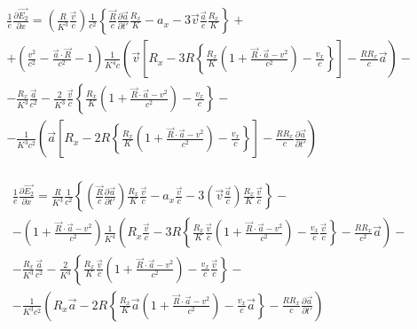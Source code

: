\documentclass[11pt]{article}
\begin{document}
\[\begin{align}
  & \frac{1}{e}\frac{\partial \overrightarrow{{{E}_{2}}}}{\partial x}=\left( \frac{R}{{{K}^{3}}}\frac{\overrightarrow{v}}{c} \right)\frac{1}{{{c}^{2}}}\left\{ \frac{\overrightarrow{R}}{c}\frac{\partial \overrightarrow{a}}{\partial t'}\frac{{{R}_{x}}}{K}-{{a}_{x}}-3\overrightarrow{v}\frac{\overrightarrow{a}}{c}\frac{{{R}_{x}}}{K} \right\}+ \\
 & +\left( \frac{{{v}^{2}}}{{{c}^{2}}}-\frac{\overrightarrow{a}\cdot \overrightarrow{R}}{{{c}^{2}}}-1 \right)\frac{1}{{{K}^{4}}c}\left( \overrightarrow{v}\left[ {{R}_{x}}-3R\left\{ \frac{{{R}_{x}}}{K}\left( 1+\frac{\overrightarrow{R}\cdot \overrightarrow{a}-{{v}^{2}}}{{{c}^{2}}} \right)-\frac{{{v}_{x}}}{c} \right\} \right]-\frac{R{{R}_{x}}}{c}\overrightarrow{a} \right)- \\
 & -\frac{{{R}_{x}}}{{{K}^{3}}}\frac{\overrightarrow{a}}{{{c}^{2}}}-\frac{2}{{{K}^{3}}}\frac{\overrightarrow{v}}{c}\left\{ \frac{{{R}_{x}}}{K}\left( 1+\frac{\overrightarrow{R}\cdot \overrightarrow{a}-{{v}^{2}}}{{{c}^{2}}} \right)-\frac{{{v}_{x}}}{c} \right\}- \\
 & -\frac{1}{{{K}^{3}}{{c}^{2}}}\left( \overrightarrow{a}\left[ {{R}_{x}}-2R\left\{ \frac{{{R}_{x}}}{K}\left( 1+\frac{\overrightarrow{R}\cdot \overrightarrow{a}-{{v}^{2}}}{{{c}^{2}}} \right)-\frac{{{v}_{x}}}{c} \right\} \right]-\frac{R{{R}_{x}}}{c}\frac{\partial \overrightarrow{a}}{\partial t'} \right) \\
\end{align}\]

\[\begin{align}
  & \frac{1}{e}\frac{\partial \overrightarrow{{{E}_{2}}}}{\partial x}=\frac{R}{{{K}^{3}}}\frac{1}{{{c}^{2}}}\left\{ \left( \frac{\overrightarrow{R}}{c}\frac{\partial \overrightarrow{a}}{\partial t'} \right)\frac{{{R}_{x}}}{K}\frac{\overrightarrow{v}}{c}-{{a}_{x}}\frac{\overrightarrow{v}}{c}-3\left( \overrightarrow{v}\frac{\overrightarrow{a}}{c} \right)\frac{{{R}_{x}}}{K}\frac{\overrightarrow{v}}{c} \right\}- \\
 & -\left( 1+\frac{\overrightarrow{R}\cdot \overrightarrow{a}-{{v}^{2}}}{{{c}^{2}}} \right)\frac{1}{{{K}^{4}}}\left( {{R}_{x}}\frac{\overrightarrow{v}}{c}-3R\left\{ \frac{{{R}_{x}}}{K}\frac{\overrightarrow{v}}{c}\left( 1+\frac{\overrightarrow{R}\cdot \overrightarrow{a}-{{v}^{2}}}{{{c}^{2}}} \right)-\frac{{{v}_{x}}}{c}\frac{\overrightarrow{v}}{c} \right\}-\frac{R{{R}_{x}}}{{{c}^{2}}}\overrightarrow{a} \right)- \\
 & -\frac{{{R}_{x}}}{{{K}^{3}}}\frac{\overrightarrow{a}}{{{c}^{2}}}-\frac{2}{{{K}^{3}}}\left\{ \frac{{{R}_{x}}}{K}\frac{\overrightarrow{v}}{c}\left( 1+\frac{\overrightarrow{R}\cdot \overrightarrow{a}-{{v}^{2}}}{{{c}^{2}}} \right)-\frac{{{v}_{x}}}{c}\frac{\overrightarrow{v}}{c} \right\}- \\
 & -\frac{1}{{{K}^{3}}{{c}^{2}}}\left( {{R}_{x}}\overrightarrow{a}-2R\left\{ \frac{{{R}_{x}}}{K}\overrightarrow{a}\left( 1+\frac{\overrightarrow{R}\cdot \overrightarrow{a}-{{v}^{2}}}{{{c}^{2}}} \right)-\frac{{{v}_{x}}}{c}\overrightarrow{a} \right\}-\frac{R{{R}_{x}}}{c}\frac{\partial \overrightarrow{a}}{\partial t'} \right) \\
\end{align}\]
\end{document}
